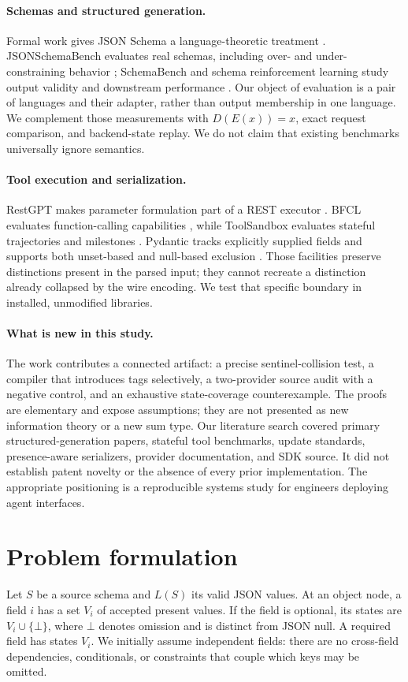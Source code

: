 \documentclass[10pt,twocolumn]{article}
\newcommand{\abs}{\bot}
\begin{document}
\paragraph{Schemas and structured generation.}
Formal work gives JSON Schema a language-theoretic treatment \citep{pezoa2016}. JSONSchemaBench evaluates real schemas, including over- and under-constraining behavior \citep{geng2025}; SchemaBench and schema reinforcement learning study output validity and downstream performance \citep{lu2025}. Our object of evaluation is a pair of languages and their adapter, rather than output membership in one language. We complement those measurements with $D(E(x))=x$, exact request comparison, and backend-state replay. We do not claim that existing benchmarks universally ignore semantics.

\paragraph{Tool execution and serialization.}
RestGPT makes parameter formulation part of a REST executor \citep{restgpt}. BFCL evaluates function-calling capabilities \citep{bfcl}, while ToolSandbox evaluates stateful trajectories and milestones \citep{toolsandbox}. Pydantic tracks explicitly supplied fields and supports both unset-based and null-based exclusion \citep{pydantic}. Those facilities preserve distinctions present in the parsed input; they cannot recreate a distinction already collapsed by the wire encoding. We test that specific boundary in installed, unmodified libraries.

\paragraph{What is new in this study.}
The work contributes a connected artifact: a precise sentinel-collision test, a compiler that introduces tags selectively, a two-provider source audit with a negative control, and an exhaustive state-coverage counterexample. The proofs are elementary and expose assumptions; they are not presented as new information theory or a new sum type. Our literature search covered primary structured-generation papers, stateful tool benchmarks, update standards, presence-aware serializers, provider documentation, and SDK source. It did not establish patent novelty or the absence of every prior implementation. The appropriate positioning is a reproducible systems study for engineers deploying agent interfaces.

\section{Problem formulation}
Let $S$ be a source schema and $L(S)$ its valid JSON values. At an object node, a field $i$ has a set $V_i$ of accepted present values. If the field is optional, its states are $V_i\cup\{\abs\}$, where $\abs$ denotes omission and is distinct from JSON null. A required field has states $V_i$. We initially assume independent fields: there are no cross-field dependencies, conditionals, or constraints that couple which keys may be omitted.
\end{document}
